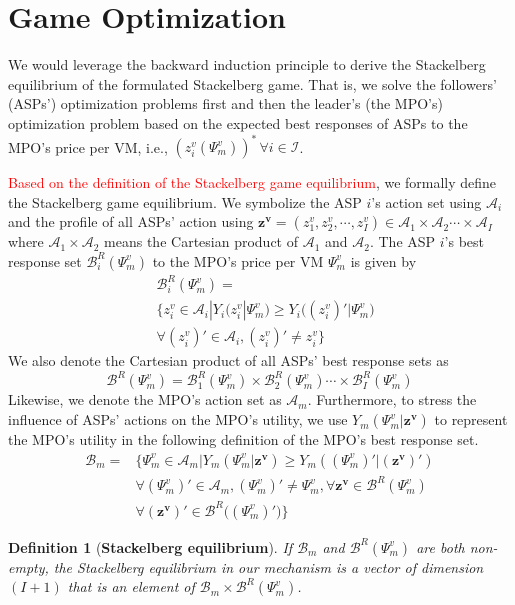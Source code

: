 \documentclass[10pt,journal, compsoc]{IEEEtran}
\newtheorem{definition}{Definition}
\begin{document}
\section{Game Optimization} \label{sec:game_optimization}
We would leverage the backward induction principle to derive the Stackelberg equilibrium of the formulated Stackelberg game. That is, we solve the followers' (ASPs') optimization problems first and then the leader's (the MPO's) optimization problem based on the expected best responses of ASPs to the MPO's price per VM, i.e., $(z_i^v(\Psi_m^v))^* \, \forall i \in \mathcal{I}$. 

\textcolor{red}{Based on the definition of the Stackelberg game equilibrium\cite{bacsar1998dynamic}}, we formally define the Stackelberg game equilibrium. We symbolize the ASP $i$'s action set using $\mathcal{A}_i$ and the profile of all ASPs' action using $\bm{z^v}=(z_1^v, z_2^v, \cdots, z_I^v) \in \mathcal{A}_1 \times \mathcal{A}_2 \cdots \times \mathcal{A}_I$ where $\mathcal{A}_1 \times \mathcal{A}_2$ means the Cartesian product of $\mathcal{A}_1$ and $\mathcal{A}_2$. The ASP $i$'s best response set $\mathcal{B}_i^R(\Psi_m^v)$ to the MPO's price per VM $\Psi_m^v$ is given by
\begin{equation} \label{eqn:asp_best_response}
\begin{aligned}
&\mathcal{B}_i^R(\Psi_m^v) = \\
&\{z_i^v \in \mathcal{A}_i |Y_i(z_i^v|\Psi_m^v) \geq Y_i\big((z_i^v)'|\Psi_m^v\big) \\
&\forall (z_i^v)' \in \mathcal{A}_i, (z_i^v)' \neq z_i^v\}
\end{aligned}
\end{equation}
We also denote the Cartesian product of all ASPs' best response sets as
\begin{equation}
\mathcal{B}^R(\Psi_m^v) = \mathcal{B}_1^R(\Psi_m^v) \times \mathcal{B}_2^R(\Psi_m^v) \cdots \times \mathcal{B}_I^R(\Psi_m^v)
\end{equation}
Likewise, we denote the MPO's action set as $\mathcal{A}_m$. Furthermore, to stress the influence of ASPs' actions on the MPO's utility, we use $Y_m(\Psi_m^v|\bm{z^v})$ to represent the MPO's utility in the following definition of the MPO's best response set.
\begin{equation} \label{eqn:mpo_best_response}
\begin{aligned}
\mathcal{B}_m = &\{\Psi_m^v \in \mathcal{A}_m| Y_m(\Psi_m^v|\bm{z^v}) \geq Y_m((\Psi_m^v)'|(\bm{z^v})') \\
&\forall (\Psi_m^v)' \in \mathcal{A}_m, (\Psi_m^v)' \neq \Psi_m^v, \forall \bm{z^v} \in \mathcal{B}^R(\Psi_m^v) \\
&\forall  (\bm{z^v})' \in \mathcal{B}^R\big((\Psi_m^v)'\big)\}
\end{aligned}
\end{equation}
\begin{definition}[\textbf{Stackelberg equilibrium}] \label{def:stackelberg_equilibrium}
If $\mathcal{B}_{m}$ and $\mathcal{B}^R(\Psi_m^v)$ are both non-empty, the Stackelberg equilibrium in our mechanism is a vector of dimension $(I+1)$ that is an element of $\mathcal{B}_m  \times \mathcal{B}^R(\Psi_m^v)$.
\end{definition}
\end{document}
